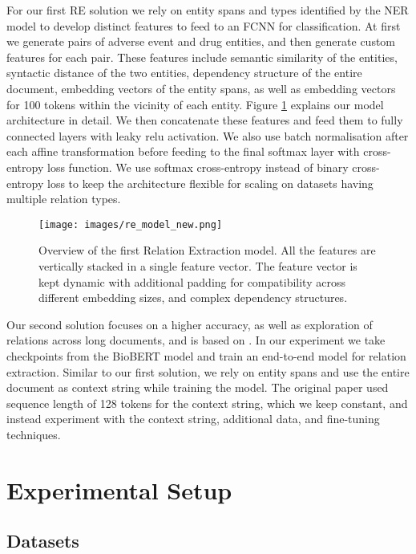 \documentclass[letterpaper]{article}
\begin{document}
For our first RE solution we rely on entity spans and types identified by the NER model to develop distinct features to feed to an FCNN for classification. At first we generate pairs of adverse event and drug entities, and then generate custom features for each pair. These features include semantic similarity of the entities, syntactic distance of the two entities, dependency structure of the entire document, embedding vectors of the entity spans, as well as embedding vectors for 100 tokens within the vicinity of each entity. Figure \ref{fig:re_model} explains our model architecture in detail. We then concatenate these features and feed them to fully connected layers with leaky relu activation. We also use batch normalisation after each affine transformation before feeding to the final softmax layer with cross-entropy loss function. We use softmax cross-entropy instead of binary cross-entropy loss to keep the architecture flexible for scaling on datasets having multiple relation types.
\begin{figure}[h!]
  \texttt{[image: images/re\_model\_new.png]}
  \caption{Overview of the first Relation Extraction model. All the features are vertically stacked in a single feature vector. The feature vector is kept dynamic with additional padding for compatibility across different embedding sizes, and complex dependency structures.}
  \label{fig:re_model}
\end{figure}

Our second solution focuses on a higher accuracy, as well as exploration of relations across long documents, and is based on \cite{DBLP:journals/corr/abs-1906-03158}. In our experiment we take checkpoints from the BioBERT model and train an end-to-end model for relation extraction. Similar to our first solution, we rely on entity spans and use the entire document as context string while training the model. The original paper used sequence length of 128 tokens for the context string, which we keep constant, and instead experiment with the context string, additional data, and fine-tuning techniques.

\section{Experimental Setup}

\subsection{Datasets}
\end{document}
